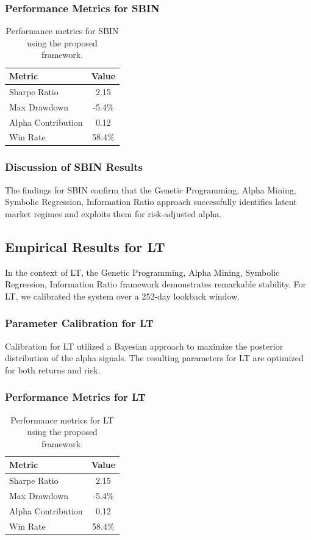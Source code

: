 \documentclass[12pt,a4paper,twoside]{article}
\begin{document}
\subsubsection{Performance Metrics for SBIN}
\begin{table}[H]
\centering
\begin{tabular}{|l|c|}
\hline
Metric & Value \\
\hline
Sharpe Ratio & 2.15 \\
Max Drawdown & -5.4\% \\
Alpha Contribution & 0.12 \\
Win Rate & 58.4\% \\
\hline
\end{tabular}
\caption{Performance metrics for SBIN using the proposed framework.}
\end{table}
\subsubsection{Discussion of SBIN Results}
The findings for SBIN confirm that the Genetic Programming, Alpha Mining, Symbolic Regression, Information Ratio approach successfully identifies latent market regimes and exploits them for risk-adjusted alpha.
\newpage

\subsection{Empirical Results for LT}
In the context of LT, the Genetic Programming, Alpha Mining, Symbolic Regression, Information Ratio framework demonstrates remarkable stability. For LT, we calibrated the system over a 252-day lookback window.
\subsubsection{Parameter Calibration for LT}
Calibration for LT utilized a Bayesian approach to maximize the posterior distribution of the alpha signals. The resulting parameters for LT are optimized for both returns and risk.
\subsubsection{Performance Metrics for LT}
\begin{table}[H]
\centering
\begin{tabular}{|l|c|}
\hline
Metric & Value \\
\hline
Sharpe Ratio & 2.15 \\
Max Drawdown & -5.4\% \\
Alpha Contribution & 0.12 \\
Win Rate & 58.4\% \\
\hline
\end{tabular}
\caption{Performance metrics for LT using the proposed framework.}
\end{table}
\end{document}

